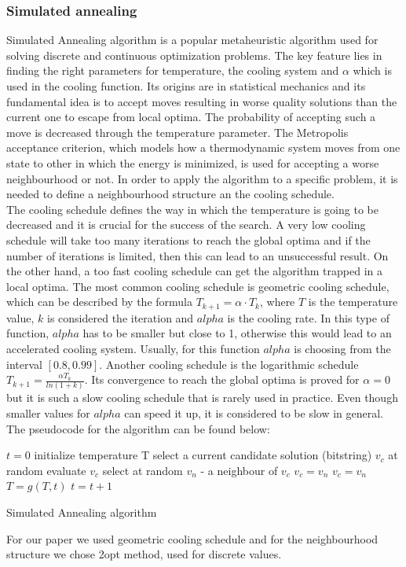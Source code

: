 \documentclass{article}
\begin{document}
\subsubsection{Simulated annealing}
Simulated Annealing algorithm is a popular metaheuristic algorithm used for solving discrete and continuous optimization problems. The key feature lies in finding the right parameters for temperature, the cooling system and $\alpha$ which is used in the cooling function. Its origins are in statistical mechanics and its fundamental idea is to accept moves resulting in worse quality solutions than the current one to escape from local optima. The probability of accepting such a move is decreased through the temperature parameter. The Metropolis acceptance criterion, which models how a thermodynamic system moves from one state to other in which the energy is minimized, is used for accepting a worse neighbourhood or not. In order to apply the algorithm to a specific problem, it is needed to define a neighbourhood structure an the cooling schedule.\\
The cooling schedule defines the way in which the temperature is going to be decreased and it is crucial for the success of the search. A very low cooling schedule will take too many iterations to reach the global optima and if the number of iterations is limited, then this can lead to an unsuccessful result. On the other hand, a too fast cooling schedule can get the algorithm trapped in a local optima. 
The most common cooling schedule is geometric cooling schedule, which can be described by the formula $T_{k+1} = \alpha \cdot T_{k}$, where $T$ is the temperature value, $k$ is considered the iteration and $alpha$ is the cooling rate. In this type of function, $alpha$ has to be smaller but close to 1, otherwise this would lead to an accelerated cooling system. Usually, for this function $alpha$ is choosing from the interval $[0.8, 0.99]$. Another cooling schedule is the logarithmic schedule $T_{k+1} = \frac{\alpha T_k}{ln(1 + k)}$. Its convergence to reach the global optima is proved for $\alpha = 0$ but it is such a slow cooling schedule that is rarely used in practice. Even though smaller values for $alpha$ can speed it up, it is considered to be slow in general.
The pseudocode for the algorithm can be found below:
\begin{algorithm}[H]
\SetAlgoLined
{}
 $t = 0$\;
 initialize temperature T\;
 select a current candidate solution (bitstring) $v_c$ at random\;
 evaluate $v_c$\;
 {
    {
        select at random $v_n$ - a neighbour of $v_c$\;
        {
            $v_c = v_n$\;
        }
        \uElseIf{random([0,1)) $< exp(-\frac{\mid{eval(v_n) - eval(v_c)}\mid}{T})$}
        {
            $v_c = v_n$\;
        }
    }
    $T = g(T,t)$\;
    $t = t + 1$\;
 }
\caption{Simulated Annealing algorithm}
\end{algorithm}
For our paper we used geometric cooling schedule and for the neighbourhood structure we chose 2opt method, used for discrete values.
\end{document}
